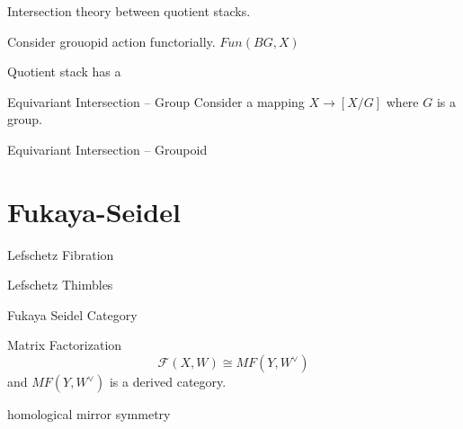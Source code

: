 \documentclass{article}
\begin{document}
\begin{definition}{}{}

\end{definition}


\noindent 
Intersection theory between quotient stacks.



\noindent
Consider grouopid action functorially.
$Fun(BG, X)$






\noindent
Quotient stack has a 


\begin{example}{Equivariant Intersection -- Group}{}
Consider a mapping $X\to [X/G]$ where $G$ is a group.


\end{example}


\begin{example}{Equivariant Intersection -- Groupoid}{}
\end{example}


\begin{definition} {}{}
\end{definition}



\section {Fukaya-Seidel}


\begin{definition} {Lefschetz Fibration}{}

\end{definition}


\begin{definition} {Lefschetz Thimbles}{}
\end{definition}


\begin{definition} {Fukaya Seidel Category}{}
\end{definition}



\begin{definition} {Matrix Factorization}{}
\[ \mathcal{F}(X,W) \cong MF(Y, W^\vee) \]
and $MF(Y, W^\vee)$ is a derived category.
\end{definition}


\begin{definition} {homological mirror symmetry}{}
\end{definition}
\end{document}
